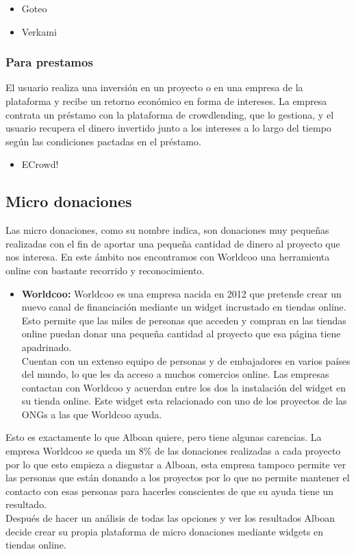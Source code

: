 \begin{itemize}
	\item Goteo
	\item Verkami
\end{itemize}

\subsubsection{Para prestamos}
El usuario realiza una inversión en un proyecto o en una empresa de la plataforma y recibe un retorno económico en forma de intereses. La empresa contrata un préstamo con la plataforma de crowdlending, que lo gestiona, y el usuario recupera el dinero invertido junto a los intereses a lo largo del tiempo según las condiciones pactadas en el préstamo.

\begin{itemize}
	\item ECrowd!
\end{itemize}

\subsection{Micro donaciones}
Las micro donaciones, como su nombre indica, son donaciones muy pequeñas realizadas con el fin de aportar una pequeña cantidad de dinero al proyecto que nos interesa. En este ámbito nos encontramos con Worldcoo\cite{worldcoo} una herramienta online con bastante recorrido y reconocimiento.

\begin{itemize}
	\item \textbf{Worldcoo:} \smallbreak
	Worldcoo es una empresa nacida en 2012 que pretende crear un nuevo canal de financiación mediante un widget incrustado en tiendas online. Esto permite que las miles de personas que acceden y compran en las tiendas online puedan donar una pequeña cantidad al proyecto que esa página tiene apadrinado.\\

	Cuentan con un extenso equipo de personas y de embajadores en varios países del mundo, lo que les da acceso a muchos comercios online. Las empresas contactan con Worldcoo y acuerdan entre los dos la instalación del widget en su tienda online. Este widget esta relacionado con uno de los proyectos de las ONGs a las que Worldcoo ayuda.
\end{itemize}

Esto es exactamente lo que Alboan quiere, pero tiene algunas carencias. La empresa Worldcoo se queda un 8\% de las donaciones realizadas a cada proyecto por lo que esto empieza a disgustar a Alboan, esta empresa tampoco permite ver las personas que están donando a los proyectos por lo que no permite mantener el contacto con esas personas para hacerles conscientes de que su ayuda tiene un resultado. \\

Después de hacer un análisis de todas las opciones y ver los resultados Alboan decide crear su propia plataforma de micro donaciones mediante widgets en tiendas online.
